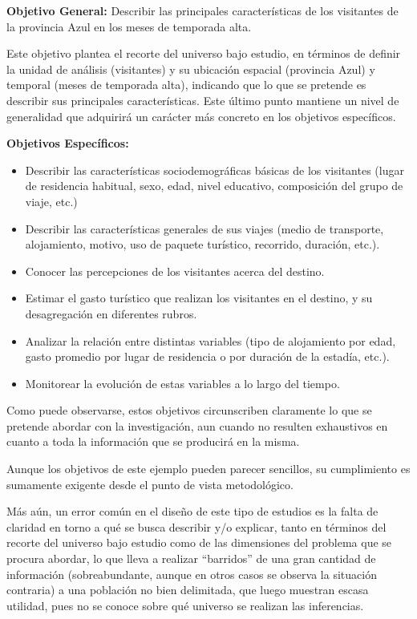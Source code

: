 \documentclass[
]{book}
\begin{document}
\textbf{Objetivo General:} Describir las principales características de los visitantes de la provincia Azul en los meses de temporada alta.

Este objetivo plantea el recorte del universo bajo estudio, en términos de definir la unidad de análisis (visitantes) y su ubicación espacial (provincia Azul) y temporal (meses de temporada alta), indicando que lo que se pretende es describir sus principales características. Este último punto mantiene un nivel de generalidad que adquirirá un carácter más concreto en los objetivos específicos.

\textbf{Objetivos Específicos:}

\begin{itemize}
\item
  Describir las características sociodemográficas básicas de los visitantes (lugar de residencia habitual, sexo, edad, nivel educativo, composición del grupo de viaje, etc.)
\item
  Describir las características generales de sus viajes (medio de transporte, alojamiento, motivo, uso de paquete turístico, recorrido, duración, etc.).
\item
  Conocer las percepciones de los visitantes acerca del destino.
\item
  Estimar el gasto turístico que realizan los visitantes en el destino, y su desagregación en diferentes rubros.
\item
  Analizar la relación entre distintas variables (tipo de alojamiento por edad, gasto promedio por lugar de residencia o por duración de la estadía, etc.).
\item
  Monitorear la evolución de estas variables a lo largo del tiempo.
\end{itemize}

Como puede observarse, estos objetivos circunscriben claramente lo que se pretende abordar con la investigación, aun cuando no resulten exhaustivos en cuanto a toda la información que se producirá en la misma.

Aunque los objetivos de este ejemplo pueden parecer sencillos, su cumplimiento es sumamente exigente desde el punto de vista metodológico.

Más aún, un error común en el diseño de este tipo de estudios es la falta de claridad en torno a qué se busca describir y/o explicar, tanto en términos del recorte del universo bajo estudio como de las dimensiones del problema que se procura abordar, lo que lleva a realizar ``barridos'' de una gran cantidad de información (sobreabundante, aunque en otros casos se observa la situación contraria) a una población no bien delimitada, que luego muestran escasa utilidad, pues no se conoce sobre qué universo se realizan las inferencias.
\end{document}
